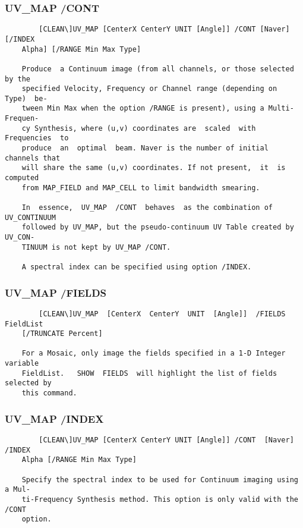 \subsubsection{UV\_MAP /CONT}
\begin{verbatim}
        [CLEAN\]UV_MAP [CenterX CenterY UNIT [Angle]] /CONT [Naver]  [/INDEX
    Alpha] [/RANGE Min Max Type]

    Produce  a Continuum image (from all channels, or those selected  by the
    specified Velocity, Frequency or Channel range (depending on  Type)  be-
    tween Min Max when the option /RANGE is present), using a Multi-Frequen-
    cy Synthesis, where (u,v) coordinates are  scaled  with  Frequencies  to
    produce  an  optimal  beam. Naver is the number of initial channels that
    will share the same (u,v) coordinates. If not present,  it  is  computed
    from MAP_FIELD and MAP_CELL to limit bandwidth smearing.

    In  essence,  UV_MAP  /CONT  behaves  as the combination of UV_CONTINUUM
    followed by UV_MAP, but the pseudo-continuum UV Table created by UV_CON-
    TINUUM is not kept by UV_MAP /CONT.

    A spectral index can be specified using option /INDEX.

\end{verbatim}
\subsubsection{UV\_MAP /FIELDS}
\begin{verbatim}
        [CLEAN\]UV_MAP  [CenterX  CenterY  UNIT  [Angle]]  /FIELDS FieldList
    [/TRUNCATE Percent]

    For a Mosaic, only image the fields specified in a 1-D Integer  variable
    FieldList.   SHOW  FIELDS  will highlight the list of fields selected by
    this command.

\end{verbatim}
\subsubsection{UV\_MAP /INDEX}
\begin{verbatim}
        [CLEAN\]UV_MAP [CenterX CenterY UNIT [Angle]] /CONT  [Naver]  /INDEX
    Alpha [/RANGE Min Max Type]

    Specify the spectral index to be used for Continuum imaging using a Mul-
    ti-Frequency Synthesis method. This option is only valid with the  /CONT
    option.


\end{verbatim}
